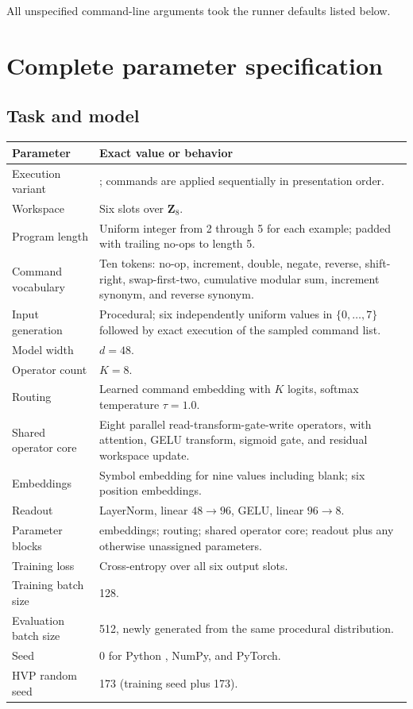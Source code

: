 \documentclass[10pt,letterpaper]{article}
\newcommand{\code}[1]{\texttt{\detokenize{#1}}}
\begin{document}
All unspecified command-line arguments took the runner defaults listed below.

\section{Complete parameter specification}

\subsection{Task and model}

\begin{longtable}{p{}p{}}
\toprule
Parameter & Exact value or behavior \\
\midrule
\endhead
Execution variant & \code{scheduled}; commands are applied sequentially in
presentation order. \\
Workspace & Six slots over $\mathbf{Z}_8$. \\
Program length & Uniform integer from 2 through 5 for each example; padded
with trailing no-ops to length 5. \\
Command vocabulary & Ten tokens: no-op, increment, double, negate, reverse,
shift-right, swap-first-two, cumulative modular sum, increment synonym, and
reverse synonym. \\
Input generation & Procedural; six independently uniform values in
$\{0,\ldots,7\}$ followed by exact execution of the sampled command list. \\
Model width & $d=48$. \\
Operator count & $K=8$. \\
Routing & Learned command embedding with $K$ logits, softmax temperature
$\tau=1.0$. \\
Shared operator core & Eight parallel read-transform-gate-write operators,
with attention, GELU transform, sigmoid gate, and residual workspace update. \\
Embeddings & Symbol embedding for nine values including blank; six position
embeddings. \\
Readout & LayerNorm, linear $48\rightarrow96$, GELU, linear
$96\rightarrow8$. \\
Parameter blocks & embeddings; routing; shared operator core; readout plus
any otherwise unassigned parameters. \\
Training loss & Cross-entropy over all six output slots. \\
Training batch size & 128. \\
Evaluation batch size & 512, newly generated from the same procedural
distribution. \\
Seed & 0 for Python \code{random}, NumPy, and PyTorch. \\
HVP random seed & 173 (training seed plus 173). \\
\bottomrule
\end{longtable}
\end{document}
